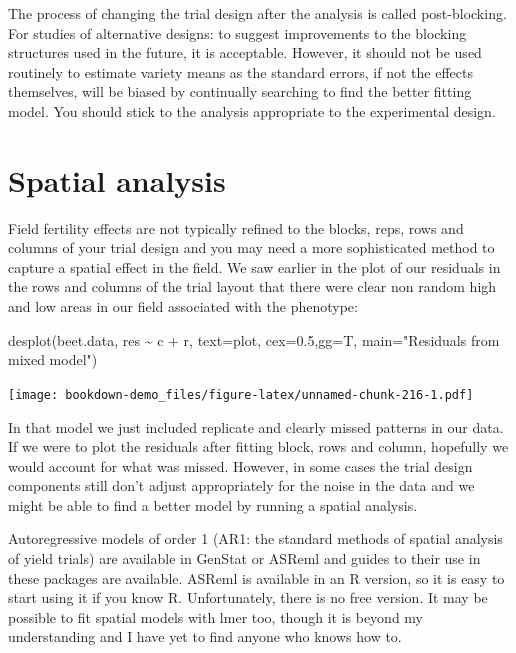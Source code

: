 \documentclass[
]{book}
\newenvironment{Shaded}{\begin{snugshade}}{\end{snugshade}}
\newcommand{\AttributeTok}[1]{\textcolor[rgb]{0.77,0.63,0.00}{#1}}
\newcommand{\FloatTok}[1]{\textcolor[rgb]{0.00,0.00,0.81}{#1}}
\newcommand{\FunctionTok}[1]{\textcolor[rgb]{0.00,0.00,0.00}{#1}}
\newcommand{\NormalTok}[1]{#1}
\newcommand{\SpecialCharTok}[1]{\textcolor[rgb]{0.00,0.00,0.00}{#1}}
\newcommand{\StringTok}[1]{\textcolor[rgb]{0.31,0.60,0.02}{#1}}
\begin{document}
The process of changing the trial design after the analysis is called post-blocking. For studies of alternative designs: to suggest improvements to the blocking structures used in the future, it is acceptable. However, it should not be used routinely to estimate variety means as the standard errors, if not the effects themselves, will be biased by continually searching to find the better fitting model. You should stick to the analysis appropriate to the experimental design.

\hypertarget{spatial-analysis}{%
\section{Spatial analysis}\label{spatial-analysis}}

Field fertility effects are not typically refined to the blocks, reps, rows and columns of your trial design and you may need a more sophisticated method to capture a spatial effect in the field. We saw earlier in the plot of our residuals in the rows and columns of the trial layout that there were clear non random high and low areas in our field associated with the phenotype:

\begin{Shaded}
\begin{Highlighting}[]
\FunctionTok{desplot}\NormalTok{(beet.data, res }\SpecialCharTok{\textasciitilde{}}\NormalTok{ c }\SpecialCharTok{+}\NormalTok{ r, }\AttributeTok{text=}\NormalTok{plot, }\AttributeTok{cex=}\FloatTok{0.5}\NormalTok{,}\AttributeTok{gg=}\NormalTok{T, }\AttributeTok{main=}\StringTok{"Residuals from mixed model"}\NormalTok{)}
\end{Highlighting}
\end{Shaded}

\texttt{[image: bookdown-demo\_files/figure-latex/unnamed-chunk-216-1.pdf]}

In that model we just included replicate and clearly missed patterns in our data. If we were to plot the residuals after fitting block, rows and column, hopefully we would account for what was missed. However, in some cases the trial design components still don't adjust appropriately for the noise in the data and we might be able to find a better model by running a spatial analysis.

Autoregressive models of order 1 (AR1: the standard methods of spatial analysis of yield trials) are available in GenStat or ASReml and guides to their use in these packages are available. ASReml is available in an R version, so it is easy to start using it if you know R. Unfortunately, there is no free version. It may be possible to fit spatial models with lmer too, though it is beyond my understanding and I have yet to find anyone who knows how to.
\end{document}
